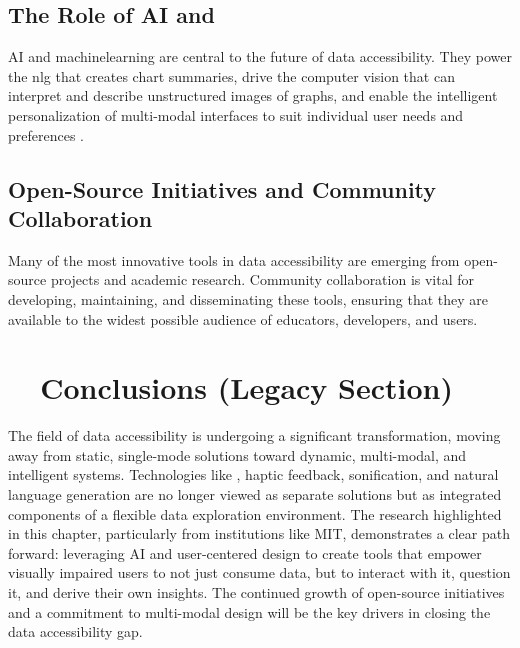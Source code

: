 \subsection{The Role of AI and }\label{ch13:ssec:ai-role}
\gls{AI} and \gls{machinelearning} are central to the future of data accessibility. They power the \gls{nlg} that creates chart summaries, drive the computer vision that can interpret and describe unstructured images of graphs, and enable the intelligent personalization of multi-modal interfaces to suit individual user needs and preferences \supercite{RECOG, NLGMeaning}.

\subsection{Open-Source Initiatives and Community Collaboration}\label{ch13:ssec:open-source}
Many of the most innovative tools in data accessibility are emerging from open-source projects and academic research. Community collaboration is vital for developing, maintaining, and disseminating these tools, ensuring that they are available to the widest possible audience of educators, developers, and users.

\section{~~Conclusions (Legacy Section)}\label{ch13:sec:conclusions}
The field of data accessibility is undergoing a significant transformation, moving away from static, single-mode solutions toward dynamic, multi-modal, and intelligent systems. Technologies like , haptic feedback, sonification, and natural language generation are no longer viewed as separate solutions but as integrated components of a flexible data exploration environment. The research highlighted in this chapter, particularly from institutions like MIT, demonstrates a clear path forward: leveraging AI and user-centered design to create tools that empower visually impaired users to not just consume data, but to interact with it, question it, and derive their own insights. The continued growth of open-source initiatives and a commitment to multi-modal design will be the key drivers in closing the data accessibility gap.

